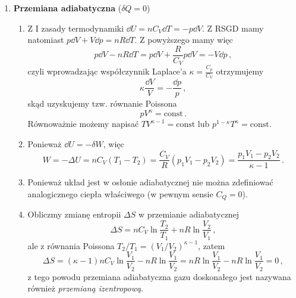 \documentclass[../main.tex]{subfiles}
\begin{document}
\begin{enumerate}
    \item \textbf{Przemiana adiabatyczna} (\(\delta Q=0\))
    
    \begin{enumerate}
        \item Z I zasady termodynamiki \(\dd{U}=nC_V\dd{T}=-p\dd{V}\). Z RSGD mamy natomiast
        \(p\dd{V}+V\dd{p}=nR\dd{T}\). Z powyższego mamy więc
        \begin{equation*}
            p\dd{V}-nR\dd{T}=p\dd{V}+\frac{R}{C_V}p\dd{V}=-V\dd{p}\,,
        \end{equation*}
        czyli wprowadzając współczynnik Laplace'a \(\kappa=\frac{C_p}{C_V}\) otrzymujemy
        \begin{equation*}
            \kappa \frac{\dd V}{V}=-\frac{\dd{p}}{p}\,,
        \end{equation*}
        skąd uzyskujemy tzw. równanie Poissona
        \begin{equation*}
            pV^\kappa=\text{const}\,.
        \end{equation*}
        Równoważnie możemy napisać \(TV^{\kappa-1}=\text{const}\) lub
        \(p^{1-\kappa}T^\kappa=\text{const}\).
        \item Ponieważ \(\dd{U}=-\delta W\), więc
        \begin{equation*}
            W=-\Delta U=nC_V(T_1-T_2)=\frac{C_V}{R}(p_1V_1-p_2V_2)=\frac{p_1V_1-p_2V_2}{\kappa-1}\,.
        \end{equation*}
        \item Ponieważ układ jest w osłonie adiabatycznej nie można zdefiniować analogicznego ciepła
        właściwego (w pewnym sensie \(C_Q=0\)).
        \item Obliczmy zmianę entropii \(\Delta S\) w przemianie adiabatycznej
        \begin{equation*}
            \Delta S=nC_V\ln\frac{T_2}{T_1}+nR\ln\frac{V_2}{V_1}\,,
        \end{equation*}
        ale z równania Poissona \(T_2/T_1=(V_1/V_2)^{\kappa-1}\), zatem
        \begin{equation*}
            \Delta S=(\kappa -1)nC_V\ln\frac{V_1}{V_2}-nR\ln\frac{V_1}{V_2}=nR\ln\frac{V_1}{V_2}-nR\ln\frac{V_1}{V_2}=0\,,
        \end{equation*}
        z tego powodu przemiana adiabatyczna gazu doskonałego jest nazywana również
        \textit{przemianą izentropową}.
    \end{enumerate}
\end{enumerate}
\end{document}
